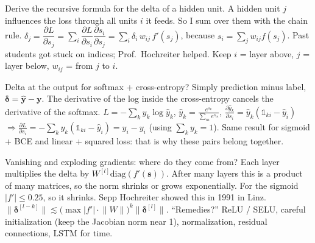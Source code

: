 \begin{qabox}{\asked Derive the recursive formula for the delta of a hidden unit.}
\ans A hidden unit $j$ influences the loss through all units $i$ it feeds. So I sum over them with
the chain rule.
\formula
$\delta_j=\dfrac{\partial L}{\partial s_j}=\sum_i\dfrac{\partial L}{\partial s_i}\dfrac{\partial s_i}{\partial s_j}
=\sum_i\delta_i\,w_{ij}\,f'(s_j)$, \quad because $s_i=\sum_j w_{ij}f(s_j)$.
\follow Past students got stuck on indices; Prof.\ Hochreiter helped. Keep $i$ = layer above,
$j$ = layer below, $w_{ij}$ = from $j$ to $i$.
\end{qabox}

\begin{qabox}[Hochreiter]{\asked Delta at the output for softmax + cross-entropy?}
\ans Simply prediction minus label, $\bm\delta=\hat{\mathbf{y}}-\mathbf{y}$. The derivative of the
log inside the cross-entropy cancels the derivative of the softmax.
\formula
$L=-\sum_k y_k\log\hat y_k$, $\hat y_k=\frac{e^{s_k}}{\sum_m e^{s_m}}$,
$\frac{\partial\hat y_k}{\partial s_i}=\hat y_k(\mathbb{1}_{ki}-\hat y_i)$
$\Rightarrow\frac{\partial L}{\partial s_i}=-\sum_k y_k(\mathbb{1}_{ki}-\hat y_i)=\hat y_i-y_i$
(using $\sum_k y_k=1$).
\follow Same result for sigmoid + BCE and linear + squared loss: that is why these pairs belong
together.
\end{qabox}

\begin{qabox}[Hochreiter]{\asked Vanishing and exploding gradients: where do they come from?}
\ans Each layer multiplies the delta by $W^{[l]}\mathrm{diag}(f'(\mathbf{s}))$. After many layers
this is a product of many matrices, so the norm shrinks or grows exponentially. For the sigmoid
$|f'|\le0.25$, so it shrinks. Sepp Hochreiter showed this in 1991 in Linz.
\formula
$\lVert\bm\delta^{[l-k]}\rVert\lesssim\bigl(\max|f'|\cdot\lVert W\rVert\bigr)^{k}\lVert\bm\delta^{[l]}\rVert$.
\follow ``Remedies?'' ReLU / SELU, careful initialization (keep the Jacobian norm near 1),
normalization, residual connections, LSTM for time.
\end{qabox}

